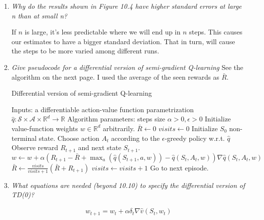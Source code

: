 \documentclass[12pt,a4paper]{article}
\begin{document}
\begin{enumerate}
  \item \textit{Why do the results shown in Figure 10.4 have higher standard errors at
  large n than at small n?}

  If $n$ is large, it's less predictable where we will end up in $n$ steps. This causes
  our estimates to have a bigger standard deviation. That in turn, will cause the steps
  to be more varied among different runs.
  
  \item \textit{Give pseudocode for a differential version of semi-gradient Q-learning}
  See the algorithm on the next page. I used the average of the seen rewards as $\bar{R}$.
  \begin{algorithm}
    \caption{Differential version of semi-gradient Q-learning}
    \begin{algorithmic}
        \STATE Inputs: a differentiable action-value function parametrization
        $\hat{q}: \mathcal{S} \times \mathcal{A} \times \mathbb{R}^d \rightarrow \mathbb{R}$
        \STATE Algorithm parameters: steps size $\alpha > 0, \epsilon > 0$
        \STATE Initialize value-function weights $w \in \mathbb{R}^d$ arbitrarily.
        \STATE $\bar{R} \leftarrow 0$
        \STATE $visits \leftarrow 0$
          \STATE Initialize $S_0$ non-terminal state.
            \STATE Choose action $A_t$ according to the $\epsilon$-greedy policy w.r.t. $\hat{q}$
            \STATE Observe reward $R_{t + 1}$ and next state $S_{t + 1}$.
            \STATE $w \leftarrow w + \alpha(R_{t + 1} - \bar{R} + \max_a(\hat{q}(S_{t + 1}, a, w))
            - \hat{q}(S_t, A_t, w)) \nabla \hat{q}(S_t, A_t, w)$
            \STATE $\bar{R} \leftarrow \frac{visits}{visits + 1} (\bar{R} + R_{t + 1})$
            \STATE $visits \leftarrow visits + 1$
              \STATE Go to next episode.
            \ENDIF
            \ENDFOR
        \ENDFOR
     \end{algorithmic}
  \end{algorithm}

  \item \textit{What equations are needed (beyond 10.10) to specify the differential
  version of TD(0)?}

    \begin{align*}
      w_{t + 1} = w_t + \alpha\delta_t \nabla \hat{v}(S_t, w_t)
    \end{align*}


\end{enumerate}
\end{document}
